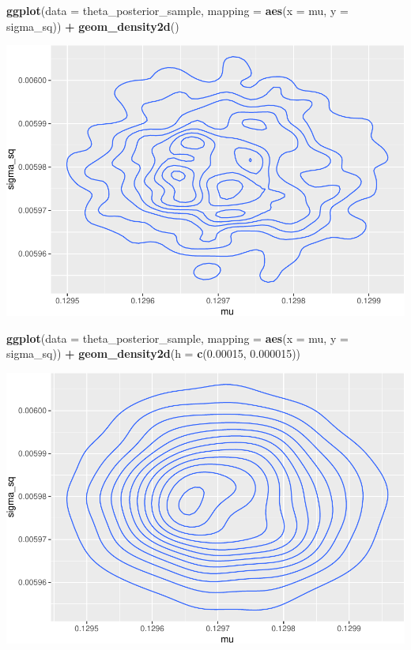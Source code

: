 \documentclass[]{article}
\newenvironment{Shaded}{\begin{snugshade}}{\end{snugshade}}
\newcommand{\KeywordTok}[1]{\textcolor[rgb]{0.13,0.29,0.53}{\textbf{#1}}}
\newcommand{\DataTypeTok}[1]{\textcolor[rgb]{0.13,0.29,0.53}{#1}}
\newcommand{\FloatTok}[1]{\textcolor[rgb]{0.00,0.00,0.81}{#1}}
\newcommand{\StringTok}[1]{\textcolor[rgb]{0.31,0.60,0.02}{#1}}
\newcommand{\OperatorTok}[1]{\textcolor[rgb]{0.81,0.36,0.00}{\textbf{#1}}}
\newcommand{\NormalTok}[1]{#1}
\begin{document}
\begin{Shaded}
\begin{Highlighting}[]
\KeywordTok{ggplot}\NormalTok{(}\DataTypeTok{data =}\NormalTok{ theta_posterior_sample, }\DataTypeTok{mapping =} \KeywordTok{aes}\NormalTok{(}\DataTypeTok{x =}\NormalTok{ mu, }\DataTypeTok{y =}\NormalTok{ sigma_sq)) }\OperatorTok{+}
\StringTok{  }\KeywordTok{geom_density2d}\NormalTok{()}
\end{Highlighting}
\end{Shaded}

\includegraphics{20190225_bayes_MCMC_Metropolis_files/figure-latex/unnamed-chunk-6-1.pdf}

\begin{Shaded}
\begin{Highlighting}[]
\KeywordTok{ggplot}\NormalTok{(}\DataTypeTok{data =}\NormalTok{ theta_posterior_sample, }\DataTypeTok{mapping =} \KeywordTok{aes}\NormalTok{(}\DataTypeTok{x =}\NormalTok{ mu, }\DataTypeTok{y =}\NormalTok{ sigma_sq)) }\OperatorTok{+}
\StringTok{  }\KeywordTok{geom_density2d}\NormalTok{(}\DataTypeTok{h =} \KeywordTok{c}\NormalTok{(}\FloatTok{0.00015}\NormalTok{, }\FloatTok{0.000015}\NormalTok{))}
\end{Highlighting}
\end{Shaded}

\includegraphics{20190225_bayes_MCMC_Metropolis_files/figure-latex/unnamed-chunk-7-1.pdf}
\end{document}
